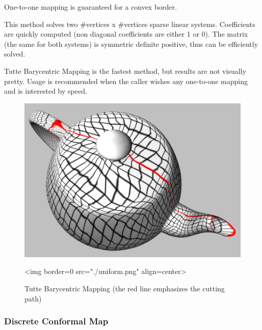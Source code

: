 One-to-one mapping is guaranteed for a convex border.

This method solves two \#vertices x \#vertices sparse linear systems. Coefficients
are quickly computed (non diagonal coefficients are either 1 or 0). The matrix
(the same for both systems) is symmetric definite positive, thus can be
efficiently solved.

Tutte Barycentric Mapping is the fastest method, but results are not visually pretty.
Usage is recommended when the caller wishes any one-to-one mapping and is
interested by speed.

\begin{figure}[bht]
    \begin{center}
        \begin{ccTexOnly}
            \includegraphics{Parameterization/uniform} %
        \end{ccTexOnly}
        \begin{ccHtmlOnly}
            <img border=0 src="./uniform.png" align=center>
        \end{ccHtmlOnly}
        \label{parameterization-fig-uniform}

        \caption{Tutte Barycentric Mapping (the red line emphasizes the cutting path)}
    \end{center}
\end{figure}


\subsubsection{Discrete Conformal Map}

